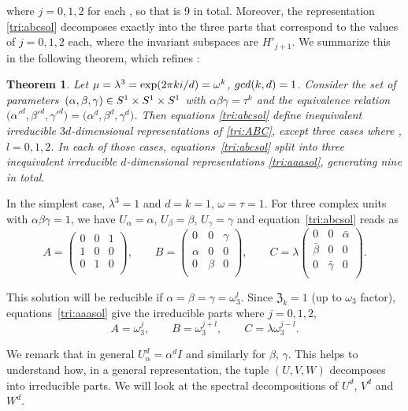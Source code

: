 \documentclass[11pt]{article}
\numberwithin{equation}{section}
\numberwithin{equation}{section}
\newtheorem{Theorem}{Theorem}[section]
\newcommand{\bmp}{\begin{pmatrix}}
\newcommand{\emp}{\end{pmatrix}}
\begin{document}
where $j=0,1,2$ for each , so that is 9 in total.
Moreover, the representation \eqref{tri:abcsol} decomposes exactly into
the three parts that correspond to the values of $j=0,1,2$ each, where the invariant subspaces are
$H'_{j+1}$.
We summarize this in the following theorem, which refines \cite[Theorem~5]{RL}:
\begin{Theorem}\label{tri:thm}
Let $\mu = \lambda^3 = \exp (2\pi k {\rm i}/d) = \omega^k$, ${\rm gcd}(k,d)=1$.
Consider the set of parameters~${(\alpha, \beta, \gamma) \in {\rm S}^1 \times {\rm S}^1 \times {\rm S}^1}$
with $\alpha\beta\gamma = \tau^k$ and
the equivalence relation $\bigl(\alpha'^d, \beta'^d, \gamma'^d\bigr) = \bigl(\alpha^d, \beta^d, \gamma^d\bigr)$.
Then equations \eqref{tri:abcsol}
define inequivalent irreducible $3d$-dimensional representations of \eqref{tri:ABC},
except three cases where , $l=0,1,2$.
In each of those cases, equations~\eqref{tri:abcsol} split into three inequivalent irreducible
$d$-dimensional representations \eqref{tri:aaasol}, generating nine in total.
\end{Theorem}

In the simplest case, $\lambda^3 = 1$ and $d=k=1$, $\omega=\tau=1$. For three complex units with
$\alpha\beta\gamma=1$, we have $U_\alpha = \alpha$, $U_\beta = \beta$, $U_\gamma = \gamma$ and
equation~\eqref{tri:abcsol} reads as
\[
A = \bmp
0 & 0 & 1 \\
1 & 0 & 0 \\
0 & 1 & 0 \\
\emp,
\qquad
B = \bmp
0 & 0 & \gamma \\
\alpha & 0 & 0 \\
0 & \beta & 0 \\
\emp,
\qquad
C = \lambda\bmp
0 & 0 & \bar{\alpha} \\
\bar{\beta} & 0 & 0 \\
0 & \bar{\gamma} & 0 \\
\emp.
\]

This solution will be reducible if $\alpha=\beta=\gamma=\omega_3^l$.
Since $\mathfrak{Z}_k=1$ (up to $\omega_3$ factor), equations~\eqref{tri:aaasol} give the irreducible parts where $j=0,1,2$,
\[
 A = \omega_3^j,
\qquad B = \omega_3^{j+l},
\qquad C = \lambda \omega_3^{j-l}.
\]

We remark that in general $U_\alpha^d = \alpha^d I$ and similarly for $\beta$, $\gamma$.
This helps to understand how, in a general representation, the tuple $(U,V,W)$ decomposes into
irreducible parts. We will look at the spectral decompositions of $U^d$, $V^d$ and $W^d$.
\end{document}
